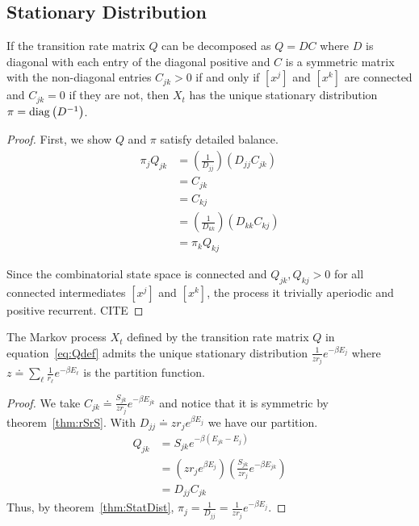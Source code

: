 \subsection{Stationary Distribution}

\begin{mythm}
\label{thm:StatDist}
If the transition rate matrix $Q$ can be decomposed as $Q = DC$ where $D$ is diagonal with each entry of the diagonal positive and $C$ is a symmetric matrix with the non-diagonal entries $C_{jk} > 0$ if and only if $[x^j]$ and $[x^k]$ are connected and $C_{jk} = 0$ if they are not, then $X_t$ has the unique stationary distribution $\pi = \operatorname{diag}\left(D^{-1}\right)$.         
\end{mythm}
\begin{proof}
First, we show $Q$ and $\pi$ satisfy detailed balance.
\begin{align}
\pi_jQ_{jk} &= \left(\frac{1}{D_{jj}}\right)\left(D_{jj}C_{jk}\right) \\
&= C_{jk} \\
&= C_{kj} \\
&= \left(\frac{1}{D_{kk}}\right)\left(D_{kk}C_{kj}\right) \\
                    &= \pi_kQ_{kj}
\end{align}

Since the combinatorial state space is connected and $Q_{jk}, Q_{kj} > 0$ for all connected intermediates $[x^j]$ and $[x^k]$, the process it trivially aperiodic and positive recurrent. CITE
\end{proof}


\begin{mythm}
\label{thm:E}
The Markov process $X_t$ defined by the transition rate matrix  $Q$ in equation~\ref{eq:Qdef} admits the unique stationary distribution $\frac{1}{zr_j}e^{-\beta E_j}$ where $z \doteq \sum_\ell \frac{1}{r_\ell}e^{-\beta E_\ell}$ is the partition function. 
\end{mythm}
\begin{proof}
We take $C_{jk} \doteq \frac{S_{jk}}{zr_j}e^{-\beta E_{jk}}$ and notice that it is symmetric by theorem~\ref{thm:rSrS}. With $D_{jj} \doteq zr_je^{\beta E_j}$ we have our partition.  
\begin{align}
Q_{jk} &= S_{jk}e^{-\beta\left(E_{jk} - E_j\right)} \\
       &= \left(zr_je^{\beta E_j}\right) \left(\frac{S_{jk}}{zr_j}e^{-\beta E_{jk}}\right) \\
       &= D_{jj}C_{jk}    
\end{align}
Thus, by theorem~\ref{thm:StatDist},  $\pi_j = \frac{1}{D_{jj}} = \frac{1}{zr_j}e^{-\beta E_j}$.
\end{proof}


